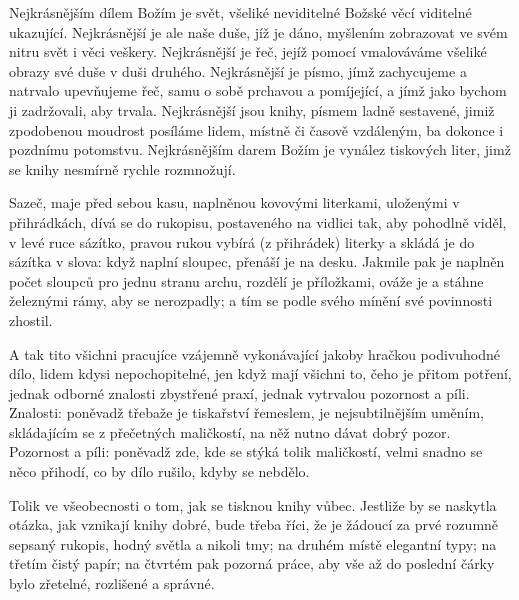 Nejkrásnějším dílem Božím je svět, všeliké neviditelné Božské věcí viditelné
ukazující. Nejkrásnější je ale naše duše, jíž je dáno, myšlením zobrazovat ve
svém nitru svět i věci veškery. Nejkrásnější je řeč, jejíž pomocí vmalováváme
všeliké obrazy své duše v duši druhého. Nejkrásnější je písmo, jímž zachycujeme a
natrvalo upevňujeme řeč, samu o sobě prchavou a pomíjející, a jímž jako bychom ji
zadržovali, aby trvala. Nejkrásnější jsou knihy, písmem ladně sestavené, jimiž
zpodobenou moudrost posíláme lidem, místně či časově vzdáleným, ba dokonce i
pozdnímu potomstvu. Nejkrásnějším darem Božím je vynález tiskových liter, jimž se
knihy nesmírně rychle rozmnožují.

Sazeč, maje před sebou kasu, naplněnou kovovými literkami, uloženými v
přihrádkách, dívá se do rukopisu, postaveného na vidlici tak, aby pohodlně viděl,
v levé ruce sázítko, pravou rukou vybírá (z přihrádek) literky a skládá je do
sázítka v slova: když naplní sloupec, přenáší je na desku. Jakmile pak je naplněn
počet sloupců pro jednu stranu archu, rozdělí je příložkami, ováže je a stáhne
železnými rámy, aby se nerozpadly; a tím se podle svého mínění své povinnosti
zhostil.

A tak tito všichni pracujíce vzájemně vykonávající jakoby hračkou podivuhodné
dílo, lidem kdysi nepochopitelné, jen když mají všichni to, čeho je přitom
potření, jednak odborné znalosti zbystřené praxí, jednak vytrvalou pozornost a
píli. Znalosti: poněvadž třebaže je tiskařství řemeslem, je nejsubtilnějším
uměním, skládajícím se z přečetných maličkostí, na něž nutno dávat dobrý pozor.
Pozornost a píli: poněvadž zde, kde se stýká tolik maličkostí, velmi snadno se
něco přihodí, co by dílo rušilo, kdyby se nebdělo.

Tolik ve všeobecnosti o tom, jak se tisknou knihy vůbec. Jestliže by se naskytla
otázka, jak vznikají knihy dobré, bude třeba říci, že je žádoucí za prvé rozumně
sepsaný rukopis, hodný světla a nikoli tmy; na druhém místě elegantní typy; na
třetím čistý papír; na čtvrtém pak pozorná práce, aby vše až do poslední čárky
bylo zřetelné, rozlišené a správné.
